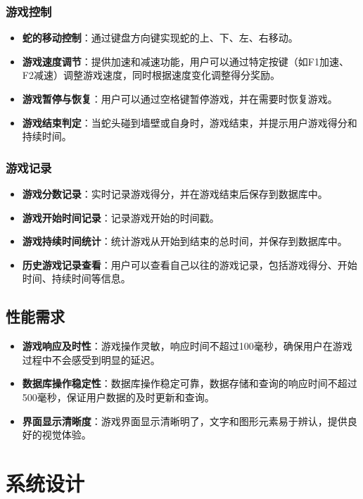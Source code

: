 \documentclass{article}
\begin{document}
\subsubsection{游戏控制}
\begin{itemize}
    \item \textbf{蛇的移动控制}：通过键盘方向键实现蛇的上、下、左、右移动。
    \item \textbf{游戏速度调节}：提供加速和减速功能，用户可以通过特定按键（如F1加速、F2减速）调整游戏速度，同时根据速度变化调整得分奖励。
    \item \textbf{游戏暂停与恢复}：用户可以通过空格键暂停游戏，并在需要时恢复游戏。
    \item \textbf{游戏结束判定}：当蛇头碰到墙壁或自身时，游戏结束，并提示用户游戏得分和持续时间。
\end{itemize}

\subsubsection{游戏记录}
\begin{itemize}
    \item \textbf{游戏分数记录}：实时记录游戏得分，并在游戏结束后保存到数据库中。
    \item \textbf{游戏开始时间记录}：记录游戏开始的时间戳。
    \item \textbf{游戏持续时间统计}：统计游戏从开始到结束的总时间，并保存到数据库中。
    \item \textbf{历史游戏记录查看}：用户可以查看自己以往的游戏记录，包括游戏得分、开始时间、持续时间等信息。
\end{itemize}

\subsection{性能需求}
\begin{itemize}
    \item \textbf{游戏响应及时性}：游戏操作灵敏，响应时间不超过100毫秒，确保用户在游戏过程中不会感受到明显的延迟。
    \item \textbf{数据库操作稳定性}：数据库操作稳定可靠，数据存储和查询的响应时间不超过500毫秒，保证用户数据的及时更新和查询。
    \item \textbf{界面显示清晰度}：游戏界面显示清晰明了，文字和图形元素易于辨认，提供良好的视觉体验。
\end{itemize}

\section{系统设计}
\end{document}
